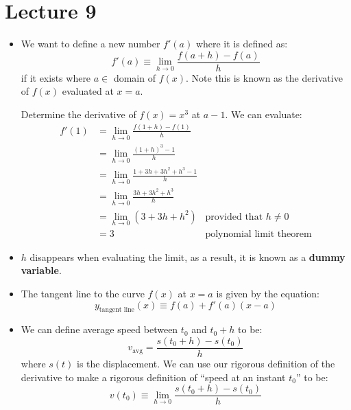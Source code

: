 \section{Lecture 9}
\begin{itemize}
    \item We want to define a new number $f'(a)$ where it is defined as:
    \begin{equation}
        f'(a) \equiv \lim_{h\to 0} \frac{f(a+h)-f(a)}{h}
        \label{eq:}
    \end{equation}
    if it exists where $a \in$ domain of $f(x)$. Note this is known as the derivative of $f(x)$ evaluated at $x=a$.
    \begin{example}
        Determine the derivative of $f(x)=x^3$ at $a-1$. We can evaluate:
        \begin{align}
            f'(1)&=\lim_{h\to 0} \frac{f(1+h)-f(1)}{h} \\ 
            &=\lim_{h\to 0} \frac{(1+h)^3-1}{h} \\
            &= \lim_{h\to 0}\frac{1+3h+3h^2+h^3-1}{h} \\ 
            &= \lim_{h\to 0}\frac{3h+3h^2+h^3}{h} \\ 
            &= \lim_{h\to 0} (3+3h+h^2) & \text{provided that } h\neq 0 \\ 
            &= 3 &\text{polynomial limit theorem}
            \label{eq:}
        \end{align}
    \end{example}
    \item $h$ disappears when evaluating the limit, as a result, it is known as a \textbf{dummy variable}.
    \item The tangent line to the curve $f(x)$ at $x=a$ is given by the equation:
    \begin{equation}
        y_\text{tangent line}(x)\equiv f(a)+f'(a)(x-a)
        \label{eq:}
    \end{equation}
    \item We can define average speed between $t_0$ and $t_0+h$ to be:
    \begin{equation}
        v_\text{avg} =\frac{s(t_0+h)-s(t_0)}{h}
        \label{eq:}
    \end{equation}
    where $s(t)$ is the displacement. We can use our rigorous definition of the derivative to make a rigorous definition of ``speed at an instant $t_0$'' to be:
    \begin{equation}
        v(t_0) \equiv \lim_{h\to 0} \frac{s(t_0+h)-s(t_0)}{h}
        \label{eq:}

\end{equation}
\end{itemize}
